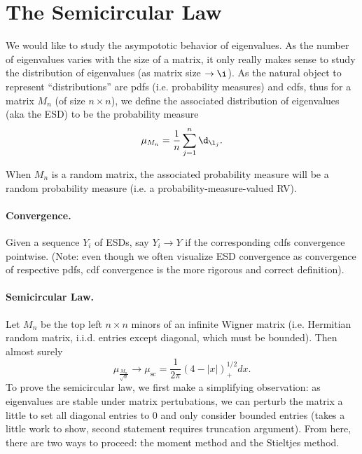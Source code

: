 \section*{The Semicircular Law}

We would like to study the asympototic behavior of eigenvalues. As the number of eigenvalues varies with the size of a matrix, it only really makes sense to study the distribution of eigenvalues (as matrix size $\to \i$). As the natural object to represent ``distributions'' are pdfs (i.e. probability measures) and cdfs, thus for a matrix $M_n$ (of size $n \times n$), we define the associated distribution of eigenvalues (aka the ESD) to be the probability measure
\[
    \mu_{M_n} = \frac{1}{n} \sum_{j = 1}^n \d_{\l_j}.
\]

When $M_n$ is a random matrix, the associated probability measure will be a random probability measure (i.e. a probability-measure-valued RV).

\paragraph{Convergence.} Given a sequence $Y_i$ of ESDs, say $Y_i \to Y$ if the corresponding cdfs convergence pointwise. (Note: even though we often visualize ESD convergence as convergence of respective pdfs, cdf convergence is the more rigorous and correct definition).

\paragraph{Semicircular Law.} Let $M_n$ be the top left $n \times n$ minors of an infinite Wigner matrix (i.e. Hermitian random matrix, i.i.d. entries except diagonal, which must be bounded). Then almost surely
\[
    \mu_{\frac{M_n}{\sqrt{n}}} \to \mu_{\text{sc}} = \frac{1}{2\pi}(4 - |x|)_+^{1/2}dx.
\]
To prove the semicircular law, we first make a simplifying observation: as eigenvalues are stable under matrix pertubations, we can perturb the matrix a little to set all diagonal entries to 0 and only consider bounded entries (takes a little work to show, second statement requires truncation argument). From here, there are two ways to proceed: the moment method and the Stieltjes method.


